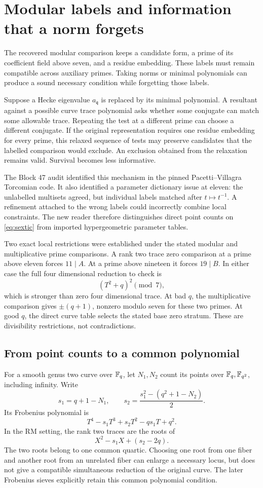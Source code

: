 \section{Modular labels and information that a norm forgets}\label{sec:labels}
The recovered modular comparison keeps a candidate form, a prime of its coefficient field above seven, and a residue embedding. These labels must remain compatible across auxiliary primes. Taking norms or minimal polynomials can produce a sound necessary condition while forgetting those labels.

Suppose a Hecke eigenvalue $a_{\mathfrak q}$ is replaced by its minimal polynomial. A resultant against a possible curve trace polynomial asks whether some conjugate can match some allowable trace. Repeating the test at a different prime can choose a different conjugate. If the original representation requires one residue embedding for every prime, this relaxed sequence of tests may preserve candidates that the labelled comparison would exclude. An exclusion obtained from the relaxation remains valid. Survival becomes less informative.

The Block 47 audit identified this mechanism in the pinned Pacetti--Villagra Torcomian code. It also identified a parameter dictionary issue at eleven: the unlabelled multisets agreed, but individual labels matched after $t\mapsto t^{-1}$. A refinement attached to the wrong labels could incorrectly combine local constraints. The new reader therefore distinguishes direct point counts on \eqref{eq:sextic} from imported hypergeometric parameter tables.

Two exact local restrictions were established under the stated modular and multiplicative prime comparisons. A rank two trace zero comparison at a prime above eleven forces $11\mid A$. At a prime above nineteen it forces $19\mid B$. In either case the full four dimensional reduction to check is
\[
(T^2+q)^2\pmod7,
\]
which is stronger than zero four dimensional trace. At bad $q$, the multiplicative comparison gives $\pm(q+1)$, nonzero modulo seven for these two primes. At good $q$, the direct curve table selects the stated base zero stratum. These are divisibility restrictions, not contradictions.

\subsection{From point counts to a common polynomial}
For a smooth genus two curve over $\mathbb F_q$, let $N_1,N_2$ count its points over $\mathbb F_q,\mathbb F_{q^2}$, including infinity. Write
\[
s_1=q+1-N_1,\qquad
s_2=\frac{s_1^2-(q^2+1-N_2)}2.
\]
Its Frobenius polynomial is
\begin{equation}\label{eq:quartic}
T^4-s_1T^3+s_2T^2-qs_1T+q^2.
\end{equation}
In the RM setting, the rank two traces are the roots of
\[
X^2-s_1X+(s_2-2q).
\]
The two roots belong to one common quartic. Choosing one root from one fiber and another root from an unrelated fiber can enlarge a necessary locus, but does not give a compatible simultaneous reduction of the original curve. The later Frobenius sieves explicitly retain this common polynomial condition.

